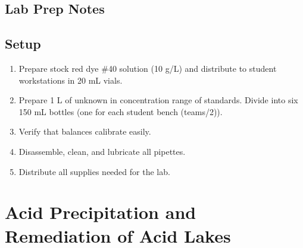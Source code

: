 \documentclass[letterpaper,10pt,english]{sphinxmanual}
\begin{document}
\section{Lab Prep Notes}
\label{\detokenize{Laboratory_Measurements/Laboratory_Measurements:lab-prep-notes}}\label{\detokenize{Laboratory_Measurements/Laboratory_Measurements:heading-laboratory-measurements-and-procedures-lab-prep-notes}}

\section{Setup}
\label{\detokenize{Laboratory_Measurements/Laboratory_Measurements:setup}}\label{\detokenize{Laboratory_Measurements/Laboratory_Measurements:heading-laboratory-measurements-and-procedures-setup}}\begin{enumerate}
\item {} 
Prepare stock red dye \#40 solution (10 g/L) and distribute to student workstations in 20 mL vials.

\item {} 
Prepare 1 L of unknown in concentration range of standards. Divide into six 150 mL bottles (one for each student bench (teams/2)).

\item {} 
Verify that balances calibrate easily.

\item {} 
Disassemble, clean, and lubricate all pipettes.

\item {} 
Distribute all supplies needed for the lab.

\end{enumerate}


\chapter{Acid Precipitation and Remediation of Acid Lakes}
\label{\detokenize{Acid_Rain/Acid_Rain:acid-precipitation-and-remediation-of-acid-lakes}}\label{\detokenize{Acid_Rain/Acid_Rain:title-acid-rain}}\label{\detokenize{Acid_Rain/Acid_Rain::doc}}
\end{document}
